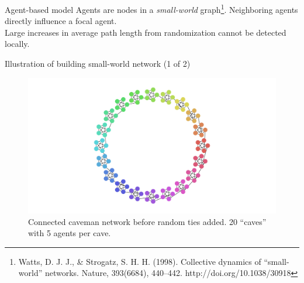\documentclass[11pt]{beamer}
\begin{document}
\begin{frame}{Agent-based model}
  Agents are nodes in a \emph{small-world} graph\footnote{Watts, D. J. J., \& Strogatz, S. H. H. (1998). Collective dynamics of “small-world” networks. Nature, 393(6684), 440–442. http://doi.org/10.1038/30918}. Neighboring agents
  directly influence a focal agent.
\\[1em]
Large increases in average path length from randomization cannot be
detected locally.
\end{frame}
\begin{frame}{Illustration of building small-world network (1 of 2)}

  \begin{figure}[t!]
    \centering
            \includegraphics[width=\textwidth]{Figures/n=20-k=5-norandom.pdf}
            \caption{Connected caveman network before random ties added.
              20 ``caves'' with 5 agents per cave.
            }
        \end{figure}
\end{frame}
\end{document}
